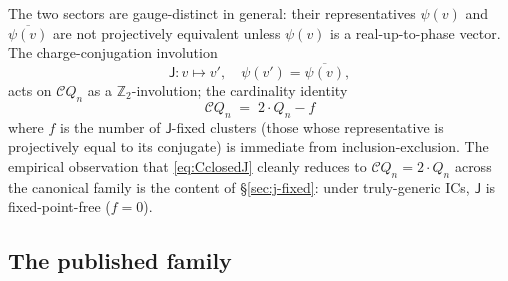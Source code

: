 \documentclass[12pt,a4paper]{article}
\theoremstyle{definition}
\theoremstyle{remark}
\newcommand{\bZ}{\mathbb{Z}}
\newcommand{\Qn}{Q_n}
\newcommand{\Ccls}{\mathcal{C}}             %
\newcommand{\Jconj}{\mathsf{J}}             %
\begin{document}
The two sectors are gauge-distinct in general: their representatives
$\psi(v)$ and $\overline{\psi(v)}$ are not projectively equivalent
unless $\psi(v)$ is a real-up-to-phase vector. The charge-conjugation
involution
\[
\Jconj : v \mapsto v', \quad \psi(v') = \overline{\psi(v)},
\]
acts on $\Ccls\Qn$ as a $\bZ_2$-involution; the cardinality identity
\begin{equation}\label{eq:CclosedJ}
\Ccls\Qn \;=\; 2 \cdot \Qn - f
\end{equation}
where $f$ is the number of $\Jconj$-fixed clusters (those whose
representative is projectively equal to its conjugate) is immediate
from inclusion-exclusion. The empirical observation that
\eqref{eq:CclosedJ} cleanly reduces to $\Ccls\Qn = 2 \cdot \Qn$
across the canonical family is the content of \S\ref{sec:j-fixed}:
under truly-generic ICs, $\Jconj$ is fixed-point-free ($f = 0$).

\subsection{The published family}\label{sec:bg-published-family}
\end{document}

